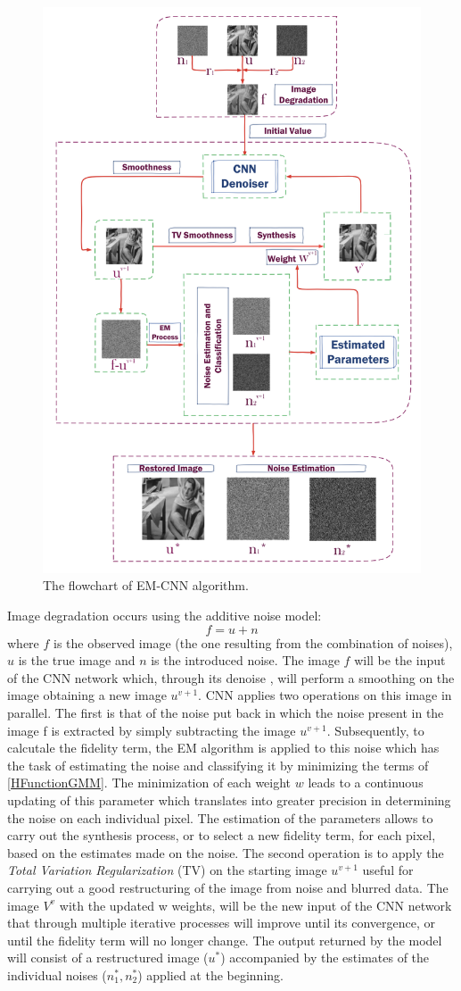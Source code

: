 \begin{figure}[h!]
    \centering
    \includegraphics[width = 0.7 \linewidth]{images/paper7/flowchart.png}
    \centering
    \caption{The flowchart of EM-CNN algorithm.}
    \label{fig:EM-CNN}
\end{figure}
Image degradation occurs using the additive noise model: 
$$ f = u + n $$
where $f$ is the observed image (the one resulting from the combination of 
noises), $u$ is the true image and $n$ is the introduced noise. The image $f$ will 
be the input of the CNN network which, through its denoise \cite{0884882819}, will perform 
a smoothing on the image obtaining a new image $u^{v+1}$. CNN applies two 
operations on this image in parallel. The first is that of the noise put back 
in which the noise present in the image f is extracted by simply subtracting 
the image $u^{v+1}$. Subsequently, to calcutale the fidelity term, the EM algorithm 
\cite{0884882814} is applied to this noise which has the task of estimating the noise 
and classifying it by minimizing the terms of \ref{HFunctionGMM}. The minimization of each 
weight $w$ leads to a continuous updating of this parameter which translates 
into greater precision in determining the noise on each individual pixel. The 
estimation of the parameters allows to carry out the synthesis process, or to 
select a new fidelity term, for each pixel, based on the estimates made on the 
noise. The second operation is to apply the \emph{Total Variation Regularization} 
(TV) \cite{0884882802} on the starting image $u^{v+1}$ useful for carrying out a good 
restructuring of the image from noise and blurred data. The image $V^v$ with the 
updated w weights, will be the new input of the CNN network that through 
multiple iterative processes will improve until its convergence, or until the 
fidelity term will no longer change. The output returned by the model will 
consist of a restructured image ($u^*$) accompanied by the estimates of the 
individual noises ($n_1^ *, n_2^*$) applied at the beginning.

